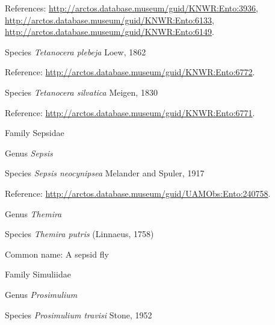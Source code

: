 \documentclass[9pt, article]{memoir}
\begin{document}
\begin{multicols}{2}
References: 
\url{http://arctos.database.museum/guid/KNWR:Ento:3936}, 
\url{http://arctos.database.museum/guid/KNWR:Ento:6133}, 
\url{http://arctos.database.museum/guid/KNWR:Ento:6149}.

\vspace{6pt}\noindent\hspace{36pt}Species \textit{Tetanocera plebeja} Loew, 1862


Reference: 
\url{http://arctos.database.museum/guid/KNWR:Ento:6772}.

\vspace{6pt}\noindent\hspace{36pt}Species \textit{Tetanocera silvatica} Meigen, 1830


Reference: 
\url{http://arctos.database.museum/guid/KNWR:Ento:6771}.

\vspace{6pt}\noindent\hspace{24pt}Family Sepsidae


\vspace{6pt}\noindent\hspace{30pt}Genus \textit{Sepsis}


\vspace{6pt}\noindent\hspace{36pt}Species \textit{Sepsis neocynipsea} Melander and Spuler, 1917


Reference: 
\url{http://arctos.database.museum/guid/UAMObs:Ento:240758}.

\vspace{6pt}\noindent\hspace{30pt}Genus \textit{Themira}


\vspace{6pt}\noindent\hspace{36pt}Species \textit{Themira putris} (Linnaeus, 1758)


Common name: A sepsid fly

\vspace{6pt}\noindent\hspace{24pt}Family Simuliidae


\vspace{6pt}\noindent\hspace{30pt}Genus \textit{Prosimulium}


\vspace{6pt}\noindent\hspace{36pt}Species \textit{Prosimulium travisi} Stone, 1952



\end{multicols}
\end{document}
